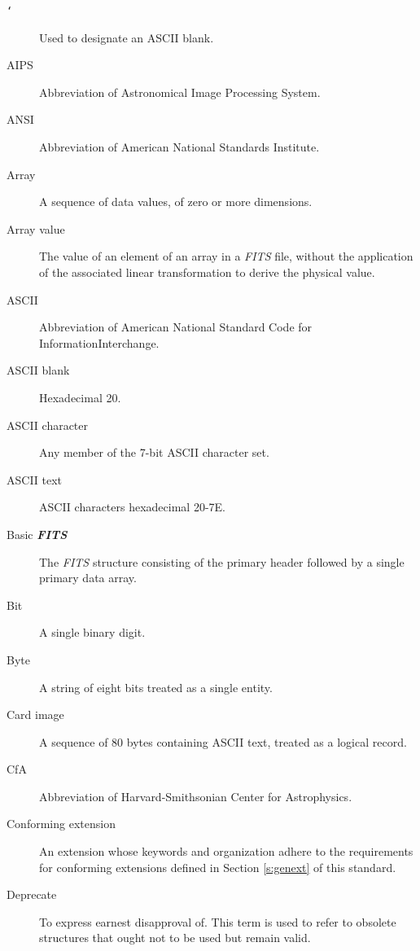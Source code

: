 \begin{description}
\item[\hbox{\tt\char`\ }] Used to designate an ASCII blank.
\item[AIPS] Abbreviation of Astronomical Image Processing 
    System.
\item[ANSI] Abbreviation of American National Standards
    Institute.
\item[Array]  A sequence of data values, of zero or more 
    dimensions.
\item[Array value] The value of an element of an array 
     in a {\em FITS\/} file, without the application of the 
     associated linear transformation to derive the
     physical value.
\item[ASCII] Abbreviation of American National Standard Code 
             for Information\linebreak[1] Interchange.
\item[ASCII blank] Hexadecimal 20.
\item[ASCII character] Any 
      member of the 7-bit ASCII character set. 
\item[ASCII text] ASCII characters 
      hexadecimal 20-7E.
\item[Basic {\em\bf FITS}] The {\em FITS\/} 
      structure 
       consisting of
       the primary header followed by a single
       primary data array.
\item[Bit] A single binary digit.
\item[Byte] A string of eight bits treated as a single entity.
\item[Card image] A sequence of 80 bytes containing
         ASCII text, treated as a logical record.
\item[CfA] Abbreviation of Harvard-Smithsonian Center for
        Astrophysics.
\item[Conforming extension] An extension whose keywords and
         organization
         adhere to the requirements for conforming extensions defined 
         in Section \ref{s:genext} of this 
         standard.
\item[Deprecate] To express earnest disapproval
        of. This term is used to refer to obsolete structures that 
        ought not to be used but remain valid.

\end{description}
